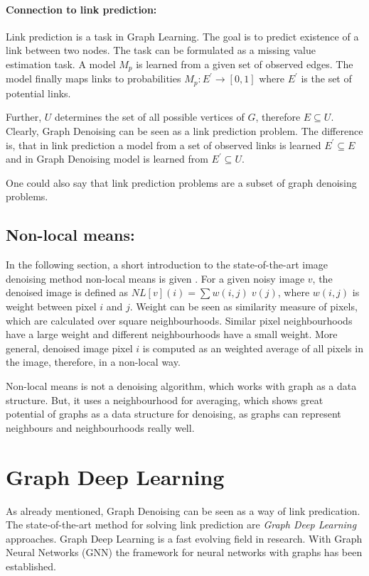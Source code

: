 \paragraph{Connection to link prediction:}
Link prediction is a task in Graph Learning. 
The goal is to predict existence of a link between two nodes.
The task can be formulated as a missing value estimation task. A model $M_p$ is learned
from a given set of observed edges. The model finally maps links to probabilities
$M_p : E^{\prime} \rightarrow [0,1]$ where $E^{\prime}$ is the set of potential links.

Further, $U$ determines the set of all possible vertices of $G$, therefore $E \subseteq U$.
Clearly, Graph Denoising can be seen as a link prediction problem.
The difference is, that in link prediction a model from a set of observed links is learned
$E^{\prime} \subseteq E$ and in Graph Denoising model is learned from 
$E^{\prime} \subseteq U$. 

\begin{tcolorbox}[colback=red!5!white,colframe=red!75!black]
    One could also say that link prediction problems are a subset of graph denoising problems.
\end{tcolorbox}

\subsection{Non-local means:}
In the following section, a short introduction to the 
state-of-the-art image denoising method non-local means is given \cite{noneLocalMean}.
For a given noisy image $v$, the denoised image is defined as $NL[v](i) = \sum{w(i,j) \; v(j)}$,
where $w(i,j)$ is weight between pixel $i$ and $j$. 
Weight can be seen as similarity measure of pixels, which are calculated over square neighbourhoods.
Similar pixel neighbourhoods have a large weight and different neighbourhoods have a small weight.
More general, denoised image pixel $i$ is computed as an weighted average of all pixels in the 
image, therefore, in a non-local way.

Non-local means is not a denoising algorithm, which works with graph as a data structure.
But, it uses a neighbourhood for averaging, which shows great potential of graphs
as a data structure for denoising, as graphs can represent neighbours and neighbourhoods really well.


\section{Graph Deep Learning}
\label{sec:graph_depp_learning}
As already mentioned, Graph Denoising can be seen as a way of link predication. 
The state-of-the-art method for solving link prediction are \textit{Graph Deep Learning} approaches.
Graph Deep Learning is a fast evolving field in research. With Graph Neural Networks (GNN) \cite{GNN} the framework
for neural networks with graphs has been established. 

